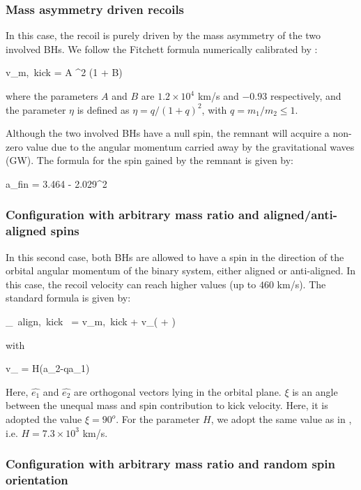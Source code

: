 \documentclass[a4,useAMS,usenatbib,usegraphicx,12pt]{article}
\begin{document}
\subsubsection{Mass asymmetry driven recoils}

In this case, the recoil is purely driven by the mass asymmetry of the two involved BHs. We follow
the Fitchett formula numerically calibrated by \citet{Gonzales2007}:

{v_{\mbox{\tiny{m, kick}}} = A \eta^2  (1 + B\eta)}

where the parameters $A$ and $B$ are $1.2\times 10^4$ km/s and $-0.93$ respectively, and the parameter
$\eta$ is defined as $\eta = q/(1+q)^2$, with $q = m_1/m_2\leq 1$.

Although the two involved BHs have a null spin, the remnant will acquire a non-zero value due to 
the angular momentum carried away by the gravitational waves (GW). The formula for the spin gained by
the remnant is given by:

{ a_{\mbox{\tiny{fin}}} = 3.464 \eta - 2.029\eta^2 }

\subsubsection{Configuration with arbitrary mass ratio and aligned/anti-aligned spins}

In this second case, both BHs are allowed to have a spin in the direction of the orbital angular 
momentum of the binary system, either aligned or anti-aligned. In this case, the recoil velocity 
can reach higher values (up to $460$ km/s). The standard formula is given by:

{ _{\mbox{\tiny{ align, kick }}} = v_{\mbox{\tiny{m, kick}}}  + 
v_{\bot}( \cos{\xi} + \sin{\xi} ) }

with 

{ v_{\bot} = H(a_2-qa_1) }

Here, $\hat{e_1}$ and $\hat{e_2}$ are orthogonal vectors lying in the orbital plane. $\xi$ is an 
angle between the unequal mass and spin contribution to kick velocity. Here, it is adopted the value
$\xi = 90^o$. For the parameter $H$, we adopt the same value as in \citet{Campanelli2007}, i.e. 
$H = 7.3 \times 10^3$ km/s.

\subsubsection{Configuration with arbitrary mass ratio and random spin orientation}
\end{document}
